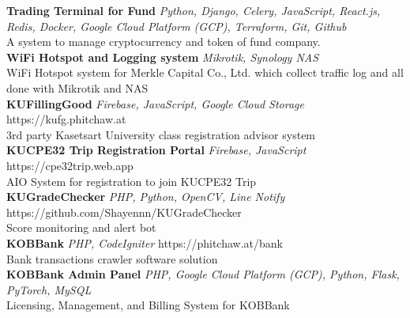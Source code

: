 {\textbf{Trading Terminal for Fund}} {\sl Python, Django, Celery, JavaScript, React.js, Redis, Docker, Google Cloud Platform (GCP), Terraform, Git, Github} \\
A system to manage cryptocurrency and token of fund company.\\
\vspace*{2mm}
{\textbf{WiFi Hotspot and Logging system}} {\sl Mikrotik, Synology NAS} \\
WiFi Hotspot system for Merkle Capital Co., Ltd. which collect traffic log and all done with Mikrotik and NAS\\
\vspace*{2mm}
{\textbf{KUFillingGood}} {\sl Firebase, JavaScript, Google Cloud Storage} \hfill https://kufg.phitchaw.at\\
3rd party Kasetsart University class registration advisor system\\
\vspace*{2mm}
{\textbf{KUCPE32 Trip Registration Portal}} {\sl Firebase, JavaScript} \hfill https://cpe32trip.web.app\\
AIO System for registration to join KUCPE32 Trip\\
\vspace*{2mm}
{\textbf{KUGradeChecker}} {\sl PHP, Python, OpenCV, Line Notify} \hfill https://github.com/Shayennn/KUGradeChecker\\
Score monitoring and alert bot\\
\vspace*{2mm}
{\textbf{KOBBank}} {\sl PHP, CodeIgniter} \hfill https://phitchaw.at/bank\\
Bank transactions crawler software solution\\
\vspace*{2mm}
{\textbf{KOBBank Admin Panel}} {\sl PHP, Google Cloud Platform (GCP), Python, Flask, PyTorch, MySQL} \\
Licensing, Management, and Billing System for KOBBank\\
\vspace*{2mm}

